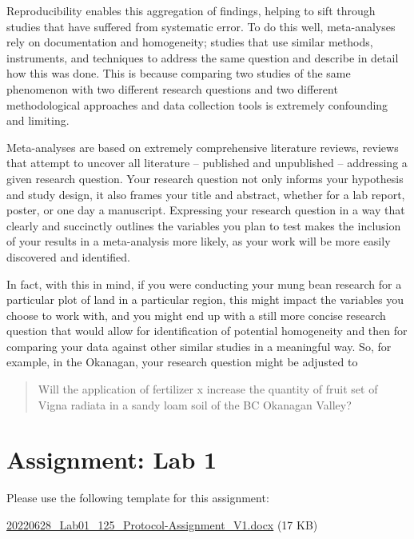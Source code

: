 \documentclass[
]{book}
\begin{document}
Reproducibility enables this aggregation of findings, helping to sift through studies that have suffered from systematic error. To do this well, meta-analyses rely on documentation and homogeneity; studies that use similar methods, instruments, and techniques to address the same question and describe in detail how this was done. This is because comparing two studies of the same phenomenon with two different research questions and two different methodological approaches and data collection tools is extremely confounding and limiting.

Meta-analyses are based on extremely comprehensive literature reviews, reviews that attempt to uncover all literature -- published and unpublished -- addressing a given research question. Your research question not only informs your hypothesis and study design, it also frames your title and abstract, whether for a lab report, poster, or one day a manuscript. Expressing your research question in a way that clearly and succinctly outlines the variables you plan to test makes the inclusion of your results in a meta-analysis more likely, as your work will be more easily discovered and identified.

In fact, with this in mind, if you were conducting your mung bean research for a particular plot of land in a particular region, this might impact the variables you choose to work with, and you might end up with a still more concise research question that would allow for identification of potential homogeneity and then for comparing your data against other similar studies in a meaningful way. So, for example, in the Okanagan, your research question might be adjusted to

\begin{quote}
Will the application of fertilizer x increase the quantity of fruit set of Vigna radiata in a sandy loam soil of the BC Okanagan Valley?
\end{quote}

\hypertarget{assignment-lab-1}{%
\chapter*{Assignment: Lab 1}\label{assignment-lab-1}}

Please use the following template for this assignment:

\href{files/20220628_Lab01_125_Protocol-Assignment_V1.docx}{20220628\_Lab01\_125\_Protocol-Assignment\_V1.docx} (17 KB)
\end{document}
